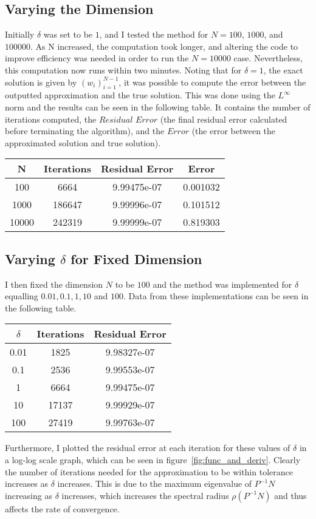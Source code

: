 \documentclass[10pt]{article}
\begin{document}
\subsection{Varying the Dimension}
Initially $\delta$ was set to be $1$, and I tested the method for $N=100$, $1000$, and $100000$. As N increased, the computation took longer, and altering the code to improve efficiency was needed in order to run the $N=10000$ case. Nevertheless, this computation now runs within two minutes. Noting that for $\delta = 1$, the exact solution is given by $(w_i)_{i=1}^{N-1}$, it was possible to compute the error between the outputted approximation and the true solution. This was done using the $L^\infty$ norm and the results can be seen in the following table. It contains the number of iterations computed, the $\textit{Residual Error}$ (the final residual error calculated before terminating the algorithm), and the $\textit{Error}$ (the error between the approximated solution and true solution).

\begin{center}
 \begin{tabular}{||c c c c ||}
 \hline
 N & Iterations & Residual Error & Error \\ [0.5ex]
 \hline\hline
 100 & 6664 & 9.99475e-07 & 0.001032 \\
 \hline
 1000 & 186647 & 9.99996e-07 & 0.101512  \\
 \hline
 10000 & 242319 & 9.99999e-07 & 0.819303 \\
 \hline
\end{tabular}
\end{center}

\subsection{Varying $\delta$ for Fixed Dimension}
I then fixed the dimension $N$ to be $100$ and the method was implemented for $\delta$ equalling $0.01,0.1,1,10$ and $100$. Data from these implementations can be seen in the following table.

\begin{center}
 \begin{tabular}{||c c c ||}
 \hline
 $\delta$ & Iterations & Residual Error \\ [0.5ex]
 \hline\hline
 0.01 & 1825 & 9.98327e-07  \\
 \hline
 0.1 & 2536 & 9.99553e-07  \\
 \hline
 1 & 6664 & 9.99475e-07 \\
 \hline
 10 & 17137 & 9.99929e-07 \\
 \hline
 100 & 27419 & 9.99763e-07 \\
 \hline
\end{tabular}
\end{center}
Furthermore, I plotted the residual error at each iteration for these values of $\delta$ in a log-log scale graph, which can be seen in figure~\ref{fig:func_and_deriv}.
Clearly the number of iterations needed for the approximation to be within tolerance increases as $\delta$ increases. This is due to the maximum eigenvalue of $P^{-1}N$ increasing as $\delta$ increases, which increases the spectral radius $\rho(P^{-1}N)$ and thus affects the rate of convergence.
\end{document}
